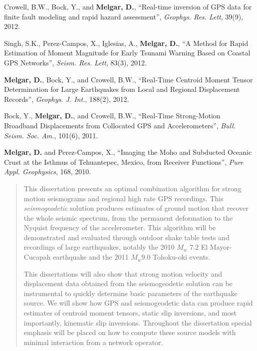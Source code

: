 \begin{frontmatter}
\begin{vitapage}
\begin{publications}
\item Crowell, B.W., Bock, Y., and \textbf{Melgar, D.}, ``Real-time inversion of GPS data for finite fault modeling and rapid hazard assessment'', \emph{Geophys. Res. Lett}, 39(9), 2012.
\item Singh, S.K., Perez-Campos, X., Iglesias, A., \textbf{Melgar, D.}, ``A Method for Rapid Estimation of Moment Magnitude for Early Tsunami Warning Based on Coastal GPS Networks'', \emph{Seism. Res. Lett}, 83(3), 2012.
\item \textbf{Melgar, D.}, Bock, Y., and Crowell, B.W., ``Real-Time Centroid Moment Tensor Determination for Large Earthquakes from Local and Regional Displacement Records'', \emph{Geophys. J. Int.}, 188(2), 2012.
\item Bock, Y., \textbf{Melgar, D.}, and Crowell, B.W., ``Real-Time Strong-Motion Broadband Displacements from Collocated GPS and Accelerometers'', \emph{Bull. Seism. Soc. Am.}, 101(6), 2011.
\item \textbf{Melgar, D.} and Perez-Campos, X., ``Imaging the Moho and Subducted Oceanic Crust at the Isthmus of Tehuantepec, Mexico, from Receiver Functions'', \emph{Pure Appl. Geophysics}, 168, 2010.

\end{publications}
\end{vitapage}


%
%
\begin{abstract}
This dissertation presents an optimal combination algorithm for strong motion seismograms and regional high rate GPS recordings. This \textit{seismogeodetic} solution produces estimates of ground motion that recover the whole seismic spectrum, from the permanent deformation to the Nyquist frequency of the accelerometer. This algorithm will be demonstrated and evaluated through outdoor shake table tests and recordings of large earthquakes, notably the 2010 $M_w$ 7.2 El Mayor-Cucapah earthquake and the 2011 $M_w 9.0$ Tohoku-oki events.

This dissertations will also show that strong motion velocity and displacement data obtained from the seismogeodetic solution can be instrumental to quickly determine basic parameters of the earthquake source. We will show how GPS and seismogeodetic data can produce rapid estimates of centroid moment tensors, static slip inversions, and most importantly, kinematic slip inversions.  Throughout the dissertation special emphasis will be placed on how to compute these source models with minimal interaction from a network operator.


\end{abstract}
\end{frontmatter}
